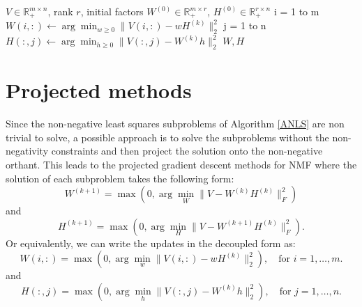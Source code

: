 \begin{algorithm}
    \caption{Alternating Non-Negative Least Squares for NMF}
    \label{ANLS}
    \begin{algorithmic}[1]
        \Require \( V \in \mathbb{R}_+^{m \times n} \), rank \( r \), initial factors \( W^{(0)} \in \mathbb{R}_+^{m \times r} \), \( H^{(0)} \in \mathbb{R}_+^{r \times n} \)
            \For i = 1 to m
                \State \( W(i,:) \leftarrow \arg\min_{w \geq 0} \|V(i,:) - w H^{(k)}\|_2^2 \)
            \EndFor
            \For j = 1 to n
                \State \( H(:,j) \leftarrow \arg\min_{h \geq 0} \|V(:,j) - W^{(k)}h\|_2^2 \)
            \EndFor
        \EndWhile
        \State \Return \( W, H \)
    \end{algorithmic}
\end{algorithm}

\section{Projected methods}
    Since the non-negative least squares subproblems of Algorithm \ref{ANLS} are non trivial to solve, a possible approach is to solve the subproblems without the non-negativity constraints and then project the solution onto the non-negative orthant.
    This leads to the projected gradient descent methods for NMF where the solution of each subproblem takes the following form:
    \begin{equation}
        W^{(k + 1)} = \max\left(0, \arg\min_W \|V - W^{(k)}H^{(k)}\|_F^2  \right)
    \end{equation}
    and
    \begin{equation}
        H^{(k + 1)} = \max\left(0, \arg\min_H \|V - W^{(k + 1)}H^{(k)}\|_F^2  \right).
    \end{equation}
    Or equivalently, we can write the updates in the decoupled form as:
    \begin{equation}
        W(i,:) = \max\left(0, \arg\min_{w} \|V(i,:) - w H^{(k)}\|_2^2 \right), \quad \text{for } i = 1, \ldots, m.
    \end{equation}
and
\begin{equation}
    H(:,j) = \max\left(0, \arg\min_{h} \|V(:,j) - W^{(k)}h\|_2^2 \right), \quad \text{for } j = 1, \ldots, n.
\end{equation}
